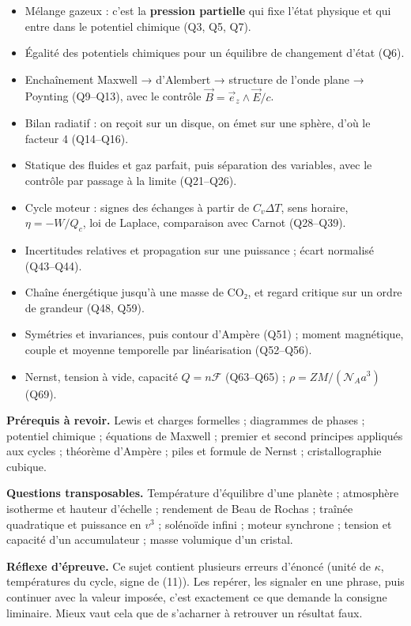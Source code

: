 \documentclass[11pt,a4paper]{article}
\providecommand{\tightlist}{\setlength{\itemsep}{0pt}\setlength{\parskip}{0pt}}
\begin{document}
\begin{itemize}
\tightlist
\item
  Mélange gazeux : c'est la \textbf{pression partielle} qui fixe l'état physique et qui entre dans le potentiel chimique (Q3, Q5, Q7).
\item
  Égalité des potentiels chimiques pour un équilibre de changement d'état (Q6).
\item
  Enchaînement Maxwell → d'Alembert → structure de l'onde plane → Poynting (Q9--Q13), avec le contrôle \(\vec B=\vec e_z\wedge\vec E/c\).
\item
  Bilan radiatif : on reçoit sur un disque, on émet sur une sphère, d'où le facteur 4 (Q14--Q16).
\item
  Statique des fluides et gaz parfait, puis séparation des variables, avec le contrôle par passage à la limite (Q21--Q26).
\item
  Cycle moteur : signes des échanges à partir de \(C_v\Delta T\), sens horaire, \(\eta=-W/Q_c\), loi de Laplace, comparaison avec Carnot (Q28--Q39).
\item
  Incertitudes relatives et propagation sur une puissance ; écart normalisé (Q43--Q44).
\item
  Chaîne énergétique jusqu'à une masse de CO₂, et regard critique sur un ordre de grandeur (Q48, Q59).
\item
  Symétries et invariances, puis contour d'Ampère (Q51) ; moment magnétique, couple et moyenne temporelle par linéarisation (Q52--Q56).
\item
  Nernst, tension à vide, capacité \(Q=n\mathcal F\) (Q63--Q65) ; \(\rho=ZM/(\mathcal N_Aa^3)\) (Q69).
\end{itemize}

\textbf{Prérequis à revoir.} Lewis et charges formelles ; diagrammes de phases ; potentiel chimique ; équations de Maxwell ; premier et second principes appliqués aux cycles ; théorème d'Ampère ; piles et formule de Nernst ; cristallographie cubique.

\textbf{Questions transposables.} Température d'équilibre d'une planète ; atmosphère isotherme et hauteur d'échelle ; rendement de Beau de Rochas ; traînée quadratique et puissance en \(v^3\) ; solénoïde infini ; moteur synchrone ; tension et capacité d'un accumulateur ; masse volumique d'un cristal.

\textbf{Réflexe d'épreuve.} Ce sujet contient plusieurs erreurs d'énoncé (unité de \(\kappa\), températures du cycle, signe de (11)). Les repérer, les signaler en une phrase, puis continuer avec la valeur imposée, c'est exactement ce que demande la consigne liminaire. Mieux vaut cela que de s'acharner à retrouver un résultat faux.
\end{document}
